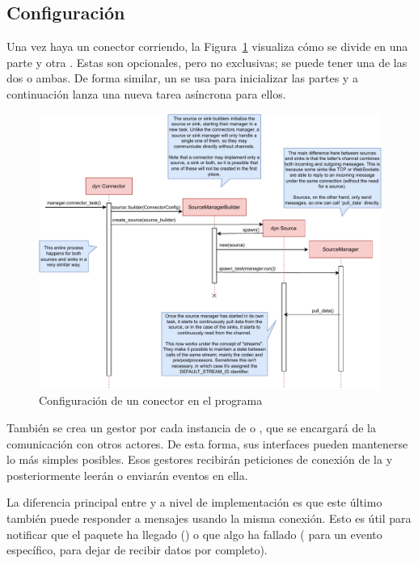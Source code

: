 \subsection{Configuración}

Una vez haya un conector corriendo, la Figura~\ref{fig:tremor_setting_up}
visualiza cómo se divide en una parte \sink y otra \source. Estas son
opcionales, pero no exclusivas; se puede tener una de las dos o ambas. De forma
similar, un \builder se usa para inicializar las partes y a continuación lanza
una nueva tarea asíncrona para ellos.

\begin{figure}
    \centering
    \includegraphics[width=\textwidth]{./Imagenes/setting-up.pdf}
    \caption{Configuración de un conector en el programa}%
    \label{fig:tremor_setting_up}
\end{figure}

También se crea un gestor por cada instancia de \sink o \source, que se
encargará de la comunicación con otros actores. De esta forma, sus interfaces
pueden mantenerse lo más simples posibles. Esos gestores recibirán peticiones de
conexión de la \pipeline y posteriormente leerán o enviarán eventos en ella.

La diferencia principal entre \sources y \sinks a nivel de implementación es que
este último también puede responder a mensajes usando la misma conexión. Esto es
útil para notificar que el paquete ha llegado () o que algo ha fallado
( para un evento específico,  para dejar de
recibir datos por completo).

